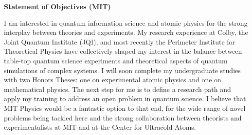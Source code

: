 \documentclass[12pt]{article}
\begin{document}
	
	
\begin{center}
	\textbf{Statement of Objectives (MIT)}
\end{center}\vspace{-5pt}	
I am interested in quantum information science and atomic physics for the strong interplay between theories and experiments. My research experience at Colby, the Joint Quantum Institute (JQI), and most recently the Perimeter Institute for Theoretical Physics have collectively shaped my interest in the balance between table-top quantum science experiments and theoretical aspects of quantum simulations of complex systems. I will soon complete my undergraduate studies with two Honors Theses: one on experimental atomic physics and one on mathematical physics. The next step for me is to define a research path and apply my training to address an open problem in quantum science. I believe that MIT Physics would be a fantastic option to that end, for the wide range of novel problems being tackled here and the strong collaboration between theorists and experimentalists at MIT and at the Center for Ultracold Atoms.    \\ \vspace{-9pt}
\end{document}
